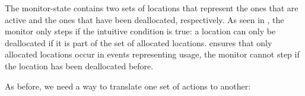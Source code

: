 \documentclass[a4paper,names,dvipsnames]{article}
\begin{document}

The monitor-state contains two sets of locations that represent the ones that are active and the ones that have been deallocated, respectively.
As seen in , the monitor only steps if the intuitive condition is true: a location can only be deallocated if it is part of the set of allocated locations.
 ensures that only allocated locations occur in events representing usage, the monitor cannot step if the location has been deallocated before.

As before, we need a way to translate one set of actions to another:
\end{document}
